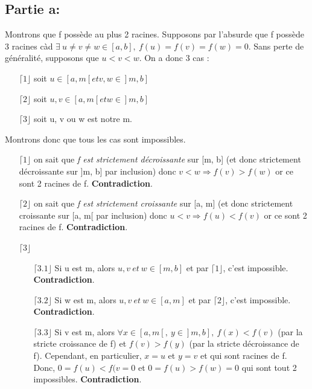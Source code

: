 \documentclass[a4paper, 12pt]{article}
\begin{document}
\subsection{Partie a:}
Montrons que f possède au plus 2 racines. \newline \newline
Supposons par l'absurde que f possède 3 racines càd \newline 
\( \exists ~ u \neq v \neq w \in [a, b], ~ f(u) = f(v) = f(w) = 0 \). \newline
Sans perte de généralité, supposons que \( u < v < w \). \newline
On a donc 3 cas :
\begin{enumerate}
	\item[\(\lceil 1 \rfloor\)] soit \( u \in [a, m[ et v, w \in ]m, b] \)
	\item[\(\lceil 2 \rfloor\)] soit \( u, v \in [a, m[ et w \in ]m, b] \)
	\item[\(\lceil 3 \rfloor\)] soit u, v ou w est notre m.
\end{enumerate}
Montrons donc que tous les cas sont impossibles.
\begin{enumerate}
	\item[\(\lceil 1 \rfloor\)] on sait que \emph{f est strictement décroissante} sur [m, b] (et donc strictement décroissante sur ]m, b] par inclusion) donc \( v < w \Rightarrow f(v) > f(w) \) or ce sont 2 racines de f. \textbf{Contradiction}.
	\item[\(\lceil 2 \rfloor\)] on sait que \emph{f est strictement croissante} sur [a, m] (et donc strictement croissante sur [a, m[ par inclusion) donc \( u < v \Rightarrow f(u) < f(v) \) or ce sont 2 racines de f. \textbf{Contradiction}.
	\item[\(\lceil 3 \rfloor\)] $~$ \newline
	\begin{enumerate}
		\item[\(\lceil 3.1 \rfloor\)] Si u est m, alors \( u, v ~ et ~ w \in [m, b] \) et par \(\lceil 1 \rfloor\), c'est impossible. \textbf{Contradiction}.
		\item[\(\lceil 3.2 \rfloor\)] Si w est m, alors \( u, v ~ et ~ w \in [a, m] \) et par \(\lceil 2 \rfloor\), c'est impossible. \textbf{Contradiction}.
		\item[\(\lceil 3.3 \rfloor\)] Si v est m, alors \( \forall x \in [a, m[, ~ y \in ]m, b], ~ f(x) < f(v) \) (par la stricte croissance de f) et \( f(v) > f(y)\) (par la stricte décroissance de f). Cependant, en particulier, \( x = u \) et \( y = v \) et qui sont racines de f. Donc, \( 0 = f(u) < f(v = 0 \) et \( 0 = f(u) > f(w) = 0 \) qui sont tout 2 impossibles. \textbf{Contradiction}. 
	\end{enumerate}
\end{enumerate}
\end{document}
